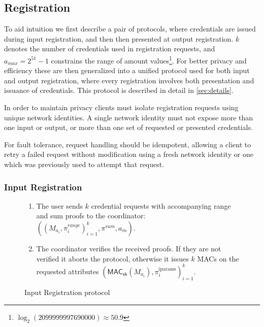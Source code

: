 \documentclass[a4paper]{article}
\begin{document}
\subsection{Registration}

To aid intuition we first describe a pair of protocols, where credentials are issued during input registration, and then then presented at output registration. $k$ denotes the number of credentials used in registration requests, and $a_{\mathit{max}} = 2^{51}-1$ constrains the range of amount values\footnote{$\log_2(2099999997690000) \approx 50.9$}. For better privacy and efficiency these are then generalized into a unified protocol used for both input and output registration, where every registration involves both presentation and issuance of credentials. This protocol is described in detail in \cref{sec:details}.

In order to maintain privacy clients must isolate registration requests using unique network identities. A single network identity must not expose more than one input or output, or more than one set of requested or presented credentials.

For fault tolerance, request handling should be idempotent, allowing a client to retry a failed request without modification using a fresh network identity or one which was previously used to attempt that request.

\subsubsection{Input Registration}

\begin{figure}[h!]
    \begin{mdframed}
    \begin{enumerate}
        \item The user sends $k$ credential requests with accompanying range and sum proofs to the coordinator:  $((M_{a_i},\pi^{\textit{range}}_{i})^{k}_{i=1},\pi^{sum},a_{\textit{in}})$.
        \item The coordinator verifies the received proofs. If they are not verified it aborts the protocol, otherwise it issues $k$ MACs on the requested attributes $(\mathsf{MAC}_\mathsf{sk}(M_{a_i}), \pi_i^{\mathrm{iparams}})^{k}_{i=1}$.
    \end{enumerate}

\end{mdframed}
    \caption{Input Registration protocol}
    \label{fig:inputreg}
\end{figure}
\end{document}
